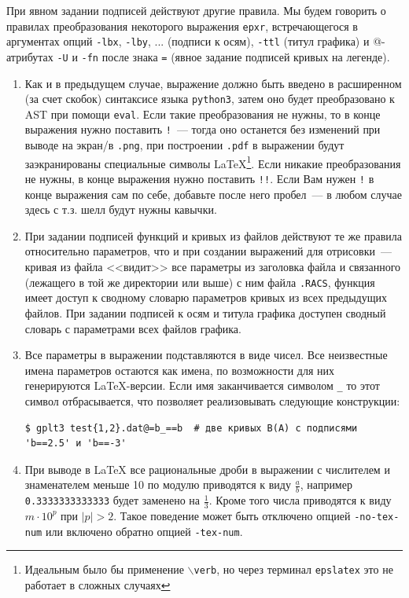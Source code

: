 \documentclass[12pt]{article}
\def\python{{\tt python3}}
\def\png{{\tt .png}}
\def\pdf{{\tt .pdf}}
\begin{document}
При явном задании подписей действуют другие правила.
Мы будем говорить о правилах преобразования некоторого выражения \verb'epxr', встречающегося в аргументах опций
\verb'-lbx', \verb'-lby', ... (подписи к осям),  \verb'-ttl' (титул графика) и @-атрибутах \verb'-U' и \verb'-fn' после знака \verb'='
(явное задание подписей кривых на легенде).   
\begin{enumerate}
\item Как и в предыдущем случае, выражение должно быть введено в расширенном (за счет скобок) синтаксисе языка \python,
  затем оно будет преобразовано к AST при помощи \verb'eval'. Если такие преобразования не нужны, то в конце выражения
  нужно поставить \verb'!'~--- тогда оно останется без изменений при выводе на экран/в \png, при построении \pdf{} в выражении
  будут заэкранированы специальные символы \LaTeX{}\footnote{Идеальным было бы применение {\tt $\backslash$verb}, но через терминал {\tt epslatex}
    это не работает в сложных случаях}.  
  Если никакие преобразования не нужны, в конце выражения нужно поставить \verb'!!'. Если Вам нужен \verb'!' в конце выражения сам по себе,
  добавьте после него пробел~--- в любом случае здесь с т.з. шелл будут нужны кавычки.
\item При задании подписей функций и кривых из файлов действуют те же правила относительно параметров, что и при создании выражений для отрисовки~---
  кривая из файла <<видит>> все параметры из заголовка файла и связанного (лежащего в той же директории или выше) с ним файла \verb'.RACS',
  функция имеет доступ к сводному словарю параметров кривых из всех предыдущих файлов. При задании подписей к осям и титула графика
  доступен сводный словарь с параметрами всех файлов графика.
\item Все параметры в выражении подставляются в виде чисел.  Все неизвестные имена параметров остаются как имена, по возможности для них генерируются \LaTeX{}-версии.
  Если имя заканчивается символом \verb'_' то этот символ отбрасывается, что позволяет реализовывать следующие конструкции:
\begin{verbatim}
$ gplt3 test{1,2}.dat@=b_==b  # две кривых B(A) с подписями 'b==2.5' и 'b==-3'
\end{verbatim}
\item   При выводе в \LaTeX{} все рациональные дроби в выражении
  с числителем и знаменателем меньше 10 по модулю приводятся к виду $\frac ab$, например \verb'0.3333333333333' будет заменено на $\frac13$. Кроме того числа приводятся к виду $m\cdot10^p$ при $|p|>2$.
  Такое поведение может быть отключено  опцией \verb'-no-tex-num' или включено обратно опцией \verb'-tex-num'.

\end{enumerate}
\end{document}
